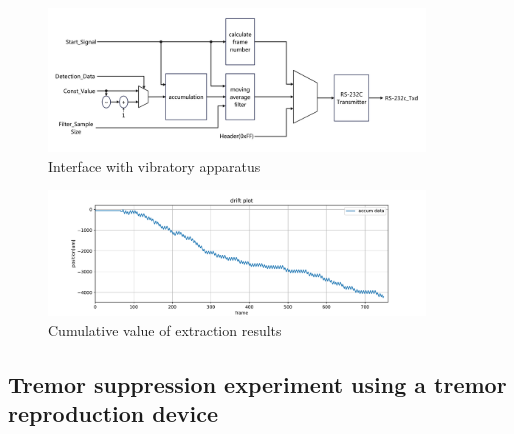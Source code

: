 \begin{figure}[tb]
  \centering
  \includegraphics[width = 10cm,pagebox=cropbox,clip]{img/interface.pdf}
  \caption{Interface with vibratory apparatus}
  \label{figure:interface}
\end{figure}

\begin{figure}[tb]
  \centering
  \includegraphics[width = 10cm,pagebox=cropbox,clip]{img/drift_plot.pdf}
  \caption{Cumulative value of extraction results}
  \label{figure:drift_plot}
\end{figure}




\subsection{ Tremor suppression experiment using a tremor reproduction device}\label{subsection:suppression_experiment}




